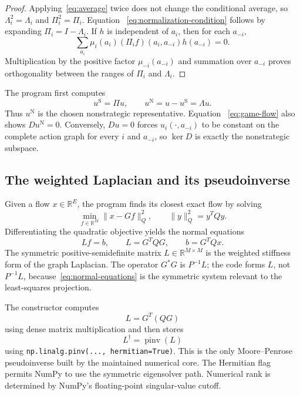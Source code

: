 \documentclass[11pt]{article}
\newcommand{\R}{\mathbb{R}}
\begin{document}
\begin{proof}
Applying~\eqref{eq:average} twice does not change the conditional average, so
$\Lambda_i^2=\Lambda_i$ and $\Pi_i^2=\Pi_i$.  Equation
~\eqref{eq:normalization-condition} follows by expanding $\Pi_i=I-\Lambda_i$.
If $h$ is independent of $a_i$, then for each $a_{-i}$,
\[
 \sum_{a_i}\mu_i(a_i)(\Pi_i f)(a_i,a_{-i})h(a_{-i})=0.
\]
Multiplication by the positive factor $\mu_{-i}(a_{-i})$ and summation over
$a_{-i}$ proves orthogonality between the ranges of $\Pi_i$ and $\Lambda_i$.
\end{proof}

The program first computes
\begin{equation}
 u^{\mathrm S}=\Pi u,\qquad u^{\mathrm N}=u-u^{\mathrm S}=\Lambda u.
 \label{eq:strategic-normalization}
\end{equation}
Thus $u^{\mathrm N}$ is the chosen nonstrategic representative.  Equation
~\eqref{eq:game-flow} also shows $Du^{\mathrm N}=0$.  Conversely, $Du=0$
forces $u_i(\cdot,a_{-i})$ to be constant on the complete action graph for
every $i$ and $a_{-i}$, so $\ker D$ is exactly the nonstrategic subspace.

\subsection{The weighted Laplacian and its pseudoinverse}

Given a flow $x\in\R^E$, the program finds its closest exact flow by solving
\begin{equation}
 \min_{f\in\R^M}\|x-Gf\|_Q^2,
 \qquad \|y\|_Q^2=y^TQy.
 \label{eq:least-squares}
\end{equation}
Differentiating the quadratic objective yields the normal equations
\begin{equation}
Lf=b,\qquad L=G^TQG,\qquad b=G^TQx.
 \label{eq:normal-equations}
\end{equation}
The symmetric positive-semidefinite matrix $L\in\R^{M\times M}$ is the
weighted stiffness form of the graph Laplacian.  The operator $G^*G$ is
$P^{-1}L$; the code forms $L$, not $P^{-1}L$, because~\eqref{eq:normal-equations}
is the symmetric system relevant to the least-squares projection.

The constructor computes
\begin{equation}
 L=G^T(QG)
 \end{equation}
using dense matrix multiplication and then stores
\begin{equation}
 L^\dagger=\operatorname{pinv}(L)
 \label{eq:laplacian-pinv}
\end{equation}
using \texttt{np.linalg.pinv(..., hermitian=True)}.  This is the only
Moore--Penrose pseudoinverse built by the maintained numerical core.  The
Hermitian flag permits NumPy to use the symmetric eigensolver path.  Numerical
rank is determined by NumPy's floating-point singular-value cutoff.
\end{document}
